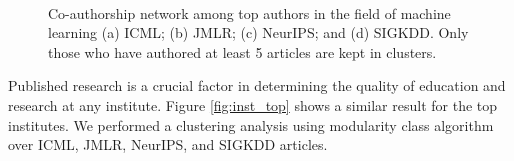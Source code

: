 \begin{figure}[!htbp]
	\centering
	\\
	\caption{Co-authorship network among top authors in the field of machine learning (a) ICML; (b) JMLR; (c) NeurIPS; and (d) SIGKDD. Only those who have authored at least 5 articles are kept in clusters.}
	\label{fig:authors_top_gephi}
\end{figure}


Published research is a crucial factor in determining the quality of education and research at any institute. Figure \ref{fig:inst_top} shows a similar result for the top institutes. We performed a clustering analysis using modularity class algorithm over ICML, JMLR, NeurIPS, and SIGKDD articles. 


